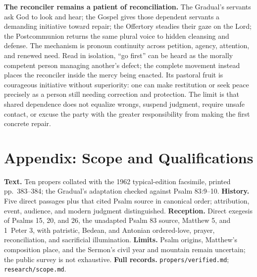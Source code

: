 \begin{deepstudy}
\noindent\textbf{The reconciler remains a patient of reconciliation.\enspace{}}
The Gradual's servants ask God to look and hear; the Gospel gives those dependent servants a demanding initiative toward repair; the Offertory steadies their gaze on the Lord; the Postcommunion returns the same plural voice to hidden cleansing and defense. The mechanism is pronoun continuity across petition, agency, attention, and renewed need. Read in isolation, ``go first'' can be heard as the morally competent person managing another's defect; the complete movement instead places the reconciler inside the mercy being enacted. Its pastoral fruit is courageous initiative without superiority: one can make restitution or seek peace precisely as a person still needing correction and protection. The limit is that shared dependence does not equalize wrongs, suspend judgment, require unsafe contact, or excuse the party with the greater responsibility from making the first concrete repair.

\sectionguard
\clearpage

\section*{Appendix: Scope and Qualifications}

\begin{studyframe}
\textbf{Text.} Ten propers collated with the 1962 typical-edition facsimile, printed pp.~383--384; the Gradual's adaptation checked against Psalm 83:9--10. \textbf{History.} Five direct passages plus that cited Psalm source in canonical order; attribution, event, audience, and modern judgment distinguished. \textbf{Reception.} Direct exegesis of Psalms 15, 20, and 26, the unadapted Psalm 83 source, Matthew 5, and 1~Peter 3, with patristic, Bedean, and Antonian ordered-love, prayer, reconciliation, and sacrificial illumination. \textbf{Limits.} Psalm origins, Matthew's composition place, and the Sermon's civil year and mountain remain uncertain; the public survey is not exhaustive. \textbf{Full records.} \nolinkurl{propers/verified.md}; \nolinkurl{research/scope.md}.
\end{studyframe}


\end{deepstudy}

